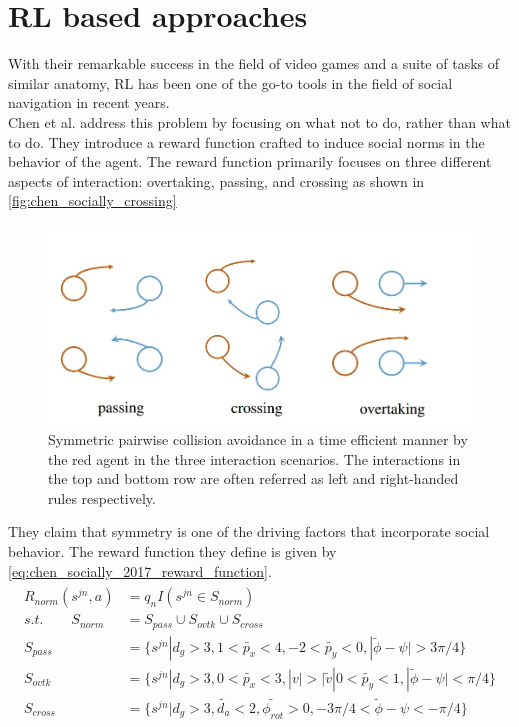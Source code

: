 \section{RL based approaches}
 With their remarkable success in the field of video games and a suite of tasks of similar anatomy, RL has been one of the go-to tools in the field of social navigation in recent years. \\
Chen et al. \cite{chen_socially_2017} address this problem by focusing on what not to do, rather than what to do. They introduce a reward function crafted to induce social norms in the behavior of the agent. The reward function primarily focuses on three different aspects of interaction: overtaking, passing, and crossing as shown in \autoref{fig:chen_socially_crossing}
 \begin{figure}[!htbp]
     \centering
    \includegraphics[width=.6\linewidth]{figures/chapter2_rl_based_approach}
    \caption{Symmetric pairwise collision avoidance in a time efficient manner by the red agent in the three interaction scenarios. The interactions in the top and bottom row are often referred as left and right-handed rules respectively.}
    \label{fig:chen_socially_crossing}
 \end{figure}
They claim that symmetry is one of the driving factors that incorporate social behavior. The reward function they define is given by \autoref{eq:chen_socially_2017_reward_function}.
\begin{align}
\label{eq:chen_socially_2017_reward_function}
\begin{split}
R_{norm}(s^{jn}, a) &=  q_nI(s^{jn} \in S_{norm})\\
s.t. \qquad S_{norm}&=  S_{pass} \cup S_{ovtk} \cup S_{cross}\\
S_{pass} &= \{s^{jn} | d_g > 3, 1 < \tilde{p_x} < 4,
			  -2 < \tilde{p_y} < 0, |\tilde{\phi} - \psi| > 3\pi/4 \} \\
S_{ovtk} &= \{s^{jn} | d_g > 3, 0 < \tilde{p_x} < 3, |v| > |\tilde{v}|
			  0 < \tilde{p_y} < 1, |\tilde{\phi} - \psi| < \pi/4 \} \\
S_{cross} &= \{s^{jn} | d_g > 3, \tilde{d_a} < 2,  \tilde{\phi_{rot}} > 0,
			  -3\pi/4 < \tilde{\phi} - \psi < -\pi/4  \}
\end{split}
\end{align}\\
